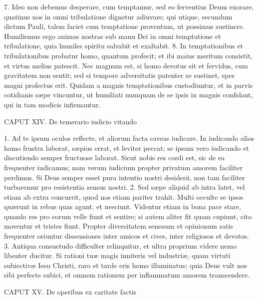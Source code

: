 \documentclass[twoside]{article}
\begin{document}
7. Ideo non debemus desperare, cum temptamur, sed eo ferventius Deum exorare, quatinus nos in omni tribulatione dignetur adiuvare; qui utique, secundum dictum Pauli, talem faciet cum temptatione proventum, ut possimus sustinere. Humiliemus ergo animas nostras sub manu Dei in omni temptatione et tribulatione, quia humiles spiritu salvabit et exaltabit.
8. In temptationibus et tribulationibus probatur homo, quantum profecit; et ibi maius meritum consistit, et virtus melius patescit. Nec magnum est, si homo devotus sit et fervidus, cum gravitatem non sentit; sed si tempore adversitatis patenter se sustinet, spes magni profectus erit. Quidam a magnis temptationibus custodiuntur, et in parvis cotidianis sæpe vincuntur, ut humiliati numquam de se ipsis in magnis confidant, qui in tam modicis infirmantur.


CAPUT XIV.
De temerario iudicio vitando

1. Ad te ipsum oculos reflecte, et aliorum facta caveas iudicare. In iudicando alios homo frustra laborat, sæpius errat, et leviter peccat; se ipsum vero iudicando et discutiendo semper fructuose laborat. Sicut nobis res cordi est, sic de ea frequenter iudicamus; nam verum iudicium propter privatum amorem faciliter perdimus. Si Deus semper esset pura intentio nostri desiderii, non tam faciliter turbaremur pro resistentia sensus nostri.
2. Sed sæpe aliquid ab intra latet, vel etiam ab extra concurrit, quod nos etiam pariter trahit. Multi occulte se ipsos quærunt in rebus quas agunt, et nesciunt. Videntur etiam in bona pace stare, quando res pro eorum velle fiunt et sentire; si autem aliter fit quam cupiunt, cito moventur et tristes fiunt. Propter diversitatem sensuum et opinionum satis frequenter oriuntur dissensiones inter amicos et cives, inter religiosos et devotos.
3. Antiqua consuetudo difficulter relinquitur, et ultra proprium videre nemo libenter ducitur. Si rationi tuæ magis inniteris vel industriæ, quam virtuti subiectivæ Iesu Christi, raro et tarde eris homo illuminatus; quia Deus vult nos sibi perfecte subici, et omnem rationem per inflammatum amorem transcendere.


CAPUT XV.
De operibus ex caritate factis
\end{document}
